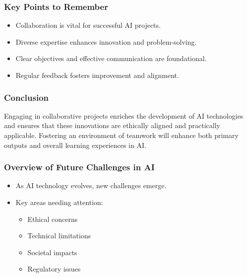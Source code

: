 \documentclass[aspectratio=169]{beamer}
\begin{document}
\begin{frame}[fragile]
    \frametitle{Key Points to Remember}
    \begin{itemize}
        \item Collaboration is vital for successful AI projects.
        \item Diverse expertise enhances innovation and problem-solving.
        \item Clear objectives and effective communication are foundational.
        \item Regular feedback fosters improvement and alignment.
    \end{itemize}
\end{frame}

\begin{frame}[fragile]
    \frametitle{Conclusion}
    Engaging in collaborative projects enriches the development of AI technologies and ensures that these innovations are ethically aligned and practically applicable. 
    Fostering an environment of teamwork will enhance both primary outputs and overall learning experiences in AI.
\end{frame}

\begin{frame}[fragile]
    \frametitle{Overview of Future Challenges in AI}
    \begin{itemize}
        \item As AI technology evolves, new challenges emerge.
        \item Key areas needing attention:
        \begin{itemize}
            \item Ethical concerns
            \item Technical limitations
            \item Societal impacts
            \item Regulatory issues
        \end{itemize}
    \end{itemize}
\end{frame}
\end{document}
